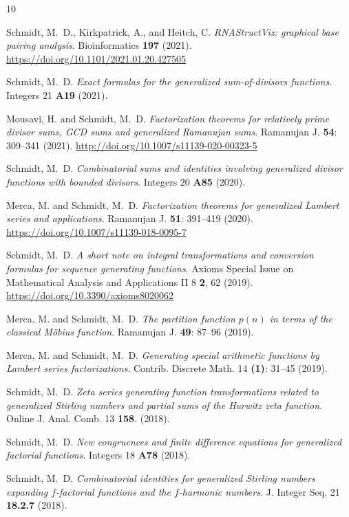 \documentclass[10pt,reqno,letterpaper]{article}
\theoremstyle{plain}
\numberwithin{theorem}{section}
\theoremstyle{definition}
\newcounter{completeBibitemIncrementCtr}
\renewenvironment{thebibliography}[1]{
     \renewcommand{\refname}{} 
     
     \begin{oldthebibliography}{#1}
     \setlength{\itemsep}{0em}
     \setlength{\parskip}{0em}
     \setlength{\topsep}{0pt}
     \setlength{\partopsep}{0pt}
     \setcounter{enumiv}{\value{completeBibitemIncrementCtr}}
     \footnotesize 
}
{
     \setcounter{completeBibitemIncrementCtr}{\value{enumiv}}
     \end{oldthebibliography}
}
\begin{document}
\begin{thebibliography}{10}

Schmidt, M.~D., Kirkpatrick, A., and Heitch, C. \emph{RNAStructViz: graphical base pairing analysis}. 
Bioinformatics {\bf 197} (2021). 
\url{https://doi.org/10.1101/2021.01.20.427505}

Schmidt, M.~D. \emph{Exact formulas for the generalized sum-of-divisors functions}. 
Integers 21 {\bf A19} (2021). 

Mousavi, H. and Schmidt, M.~D. \emph{Factorization theorems for relatively prime divisor sums, 
                                     GCD sums and generalized Ramanujan sums}. 
Ramanujan J. {\bf 54}: 309--341 (2021). 
\url{http://doi.org/10.1007/s11139-020-00323-5} 

Schmidt, M.~D. \emph{Combinatorial sums and identities involving generalized divisor functions with bounded divisors}. 
Integers 20 {\bf A85} (2020). 

Merca, M. and Schmidt, M.~D. \emph{Factorization theorems for generalized Lambert series and applications}. 
Ramanujan J. {\bf 51}: 391--419 (2020). 
\url{https://doi.org/10.1007/s11139-018-0095-7}

Schmidt, M.~D. \emph{A short note on integral transformations and 
                     conversion formulas for sequence generating functions}. 
Axioms Special Issue on Mathematical Analysis and Applications II 8 {\bf 2}, 62 (2019). 
\url{https://doi.org/10.3390/axioms8020062} 

Merca, M. and Schmidt, M.~D. \emph{The partition function $p(n)$ in terms of the classical M\"{o}bius function}. 
Ramanujan J. {\bf 49}: 87--96 (2019). 

Merca, M. and Schmidt, M.~D. \emph{Generating special arithmetic functions by Lambert series factorizations}. 
Contrib. Discrete Math. 14 {\bf (1)}: 31--45 (2019). 

Schmidt, M.~D. \emph{Zeta series generating function transformations related to 
                     generalized Stirling numbers and partial sums of the Hurwitz zeta function}. 
Online J. Anal. Comb. 13 {\bf 158}. (2018). 

Schmidt, M.~D. \emph{New congruences and finite difference equations for generalized factorial functions}. 
Integers 18 {\bf A78} (2018). 

Schmidt, M.~D. \emph{Combinatorial identities for generalized Stirling numbers 
                     expanding $f$-factorial functions and the $f$-harmonic numbers}. 
J. Integer Seq. 21 {\bf 18.2.7} (2018). 


\end{thebibliography}
\end{document}
